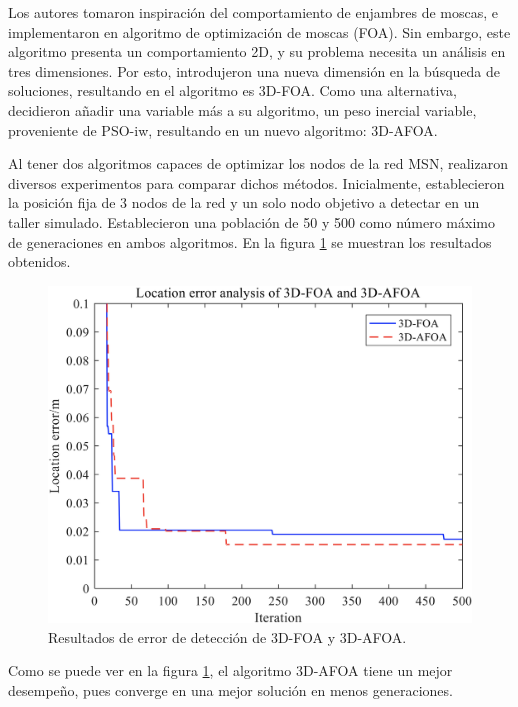 \documentclass[letterpaper]{report}
\begin{document}
    Los autores tomaron inspiración del comportamiento de enjambres de moscas,
    e implementaron en algoritmo de 
    optimización de moscas (FOA). Sin embargo, este algoritmo presenta un
    comportamiento 2D, y su problema necesita un análisis en tres dimensiones.
    Por esto, introdujeron una nueva dimensión en la búsqueda de soluciones,
    resultando en el algoritmo es 3D-FOA. Como una alternativa, decidieron
    añadir una variable más a su algoritmo, un peso inercial variable,
    proveniente de PSO-iw, resultando en un nuevo algoritmo: 3D-AFOA.

    Al tener dos algoritmos capaces de optimizar los nodos de la red MSN,
    realizaron diversos experimentos para comparar dichos métodos. Inicialmente,
    establecieron la posición fija de 3 nodos de la red y un solo nodo objetivo
    a detectar en un taller simulado. Establecieron una población de 50 y 500
    como número máximo de generaciones en ambos algoritmos. En la figura
    \ref{fig:location-error-3d-foa-3d-afoa_1} se muestran los resultados
    obtenidos.

    \begin{figure}[ht!]
      \includegraphics[width=\textwidth]{location-error-3d-foa-3d-afoa_1.png}
      \centering
      \caption{Resultados de error de detección de 3D-FOA y 3D-AFOA.}
      \label{fig:location-error-3d-foa-3d-afoa_1}
      \centering
    \end{figure}

    Como se puede ver en la figura \ref{fig:location-error-3d-foa-3d-afoa_1}, el
    algoritmo 3D-AFOA tiene un mejor desempeño, pues converge en una mejor
    solución en menos generaciones. 
\end{document}
